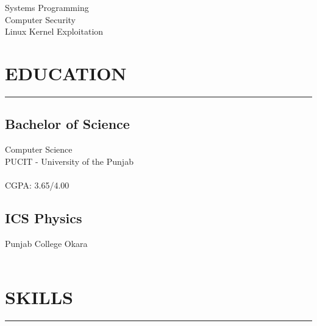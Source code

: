 


%
%

\begin{minipage}[t]{0.33\textwidth}

    \begin{large}
        \\
    \end{large}

    \vspace{4pt}
    \noindent {}\\
    Systems Programming\\
    Computer Security\\
    Linux Kernel Exploitation



    \section{EDUCATION}
    \noindent\rule{5cm}{0.4pt}

    \subsection{Bachelor of Science}
    \noindent Computer Science\\
    PUCIT - University of the Punjab\\
    \\
    CGPA: 3.65/4.00

    \vspace{8pt}
    \subsection{ICS Physics}
    \noindent Punjab College Okara\\
    \\


    \section{SKILLS}
    \noindent\rule{5cm}{0.4pt}


\end{minipage}
